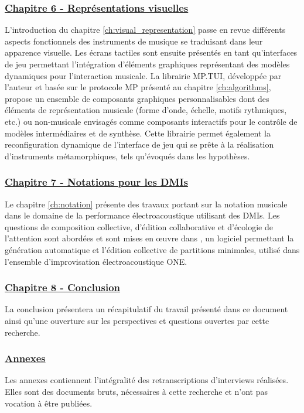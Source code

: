 \subsubsection*{\hyperref[ch:visual_representation]{Chapitre 6 - Représentations visuelles}}

\noindent L'introduction du chapitre \ref{ch:visual_representation} passe en revue différents aspects fonctionnels des instruments de musique se traduisant dans leur apparence visuelle. Les écrans tactiles sont ensuite présentés en tant qu'interfaces de jeu permettant l'intégration d'éléments graphiques représentant des modèles dynamiques pour l'interaction musicale. La librairie MP.TUI, développée par l'auteur et basée sur le protocole MP présenté au chapitre  \ref{ch:algorithms}, propose un ensemble de composants graphiques personnalisables dont des éléments de représentation musicale (forme d'onde, échelle, motifs rythmiques, etc.) ou non-musicale envisagés comme composants interactifs pour le contrôle de modèles intermédiaires et de synthèse. Cette librairie permet également la reconfiguration dynamique de l'interface de jeu qui se prête à la réalisation d'instruments métamorphiques, tels qu'évoqués dans les hypothèses.

\subsubsection*{\hyperref[ch:notation]{Chapitre 7 - Notations pour les DMIs}} 
\noindent Le chapitre \ref{ch:notation} présente des travaux portant sur la notation musicale dans le domaine de la performance électroacoustique utilisant des \glspl{DMI}. Les questions de composition collective, d'édition collaborative et d'écologie de l'attention sont abordées et sont mises en œuvre dans , un logiciel permettant la génération automatique et l'édition collective de partitions minimales, utilisé dans l'ensemble d'improvisation électroacoustique ONE. 

\subsubsection*{\hyperref[ch:conclusion]{Chapitre 8 - Conclusion}} 
\noindent La conclusion présentera un récapitulatif du travail présenté dans ce document ainsi qu'une ouverture sur les perspectives et questions ouvertes par cette recherche.

\subsubsection*{\hyperref[appendix:delaubier]{Annexes}} 
\noindent Les annexes contiennent l'intégralité des retranscriptions d'interviews réalisées. Elles sont des documents bruts, nécessaires à cette recherche et n'ont pas vocation à être publiées.





